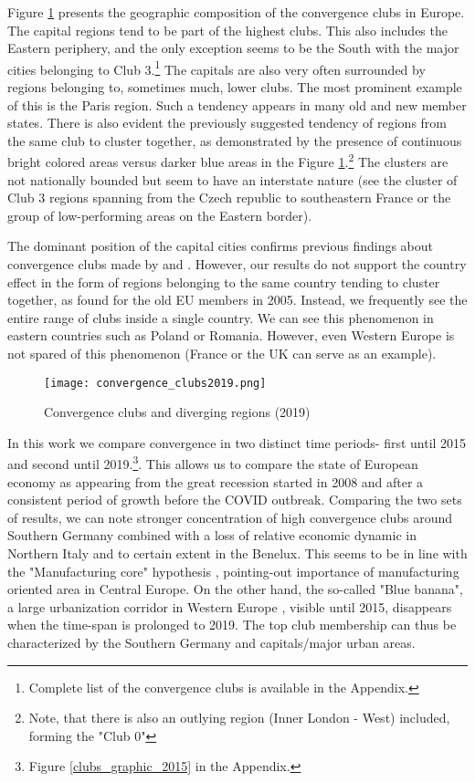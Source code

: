 \documentclass[11pt]{article}
\begin{document}
Figure \ref{clubs_graphic} presents the geographic composition of the convergence clubs in Europe. The capital regions tend to be part of the highest clubs. This also includes the Eastern periphery, and the only exception seems to be the South with the major cities belonging to Club 3.\footnote{Complete list of the convergence clubs is available in the Appendix.} The capitals are also very often surrounded by regions belonging to, sometimes much, lower clubs. The most prominent example of this is the Paris region. Such a tendency appears in many old and new member states. There is also evident the previously suggested tendency of regions from the same club to cluster together, as demonstrated by the presence of continuous bright colored areas versus darker blue areas in the Figure \ref{clubs_graphic}.\footnote{Note, that there is also an outlying region (Inner London - West) included, forming the "Club 0"} The clusters are not nationally bounded but seem to have an interstate nature (see the cluster of Club 3 regions spanning from the Czech republic to southeastern France or the group of low-performing areas on the Eastern border).


The dominant position of the capital cities confirms previous findings about convergence clubs made by \citet{sme2012regional} and \citet{bartkowska2012regional}. However, our results do not support the country effect in the form of regions belonging to the same country tending to cluster together, as \citet{bartkowska2012regional} found for the old EU members in 2005. Instead, we frequently see the entire range of clubs inside a single country. We can see this phenomenon in eastern countries such as Poland or Romania. However,
even Western Europe is not spared of this phenomenon (France or the UK can serve as an example).


\begin{figure}%
\centering 
  {\texttt{[image: convergence\_clubs2019.png]} }
  \caption{Convergence clubs and diverging regions (2019)}
\label{clubs_graphic}
\end{figure} 


In this work we compare convergence in two distinct time periods- first until 2015 and second until 2019.\footnote{Figure \ref{clubs_graphic_2015} in the Appendix.}. This allows us to compare the state of European economy as appearing from the great recession started in 2008 and after a consistent period of growth before the COVID outbreak.  
Comparing the two sets of results, we can note stronger concentration of high convergence clubs around Southern Germany combined with a loss of relative economic dynamic in Northern Italy and to certain extent in the Benelux. This seems to be in line with the "Manufacturing core" hypothesis \citep{cutrini2019economic, stollinger2016structural}, pointing-out importance of manufacturing oriented area in Central Europe. On the other hand, the so-called "Blue banana", a large urbanization corridor in Western Europe \citep{hospers2002beyond}, visible until 2015, disappears when the time-span is prolonged to 2019. The top club membership can thus be characterized by the Southern Germany and capitals/major urban areas.
\end{document}
